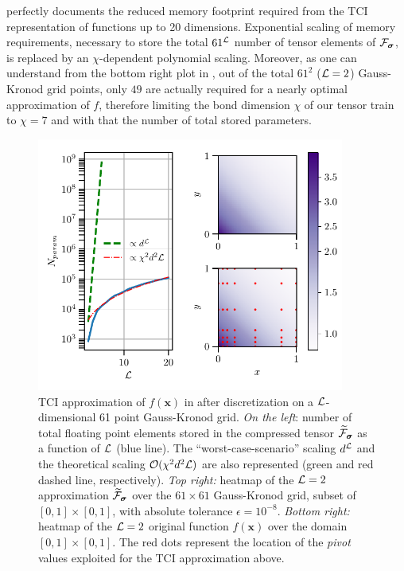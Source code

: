 \begin{example}
 perfectly documents the reduced memory footprint required from the TCI representation of functions up to 20 dimensions. Exponential scaling of memory requirements, necessary to store the total $61^{\mathcal{L}}$ number of tensor elements of $\mathcal{F}_{\boldsymbol{\sigma}}$, is replaced by an $\chi$-dependent polynomial scaling. Moreover, as one can understand from the bottom right plot in , out of the total $61^2$ ($\mathcal{L}=2$) Gauss-Kronod grid points, only $49$ are actually required for a nearly optimal approximation of $f$, therefore limiting the bond dimension $\chi$ of our tensor train to $\chi = 7$ and with that the number of total stored parameters. 
\begin{figure}[ht!]
		\centering
		\includegraphics[width=0.9\textwidth]{figures/TCI_memory_scaling+heatmap.pdf}
		\caption{TCI approximation of $f(\boldsymbol{x})$ in  after discretization on a $\mathcal{L}$-dimensional 61 point Gauss-Kronod grid. \textit{On the left}: number of total floating point elements stored in the compressed tensor $\widetilde{\mathcal{F}}_{\boldsymbol{\sigma}}$ as a function of $\mathcal{L}$ (blue line). The ``worst-case-scenario'' scaling $d^{\mathcal{L}}$ and the theoretical scaling $\mathcal{O} (\chi^2d^2\mathcal{L})$ are also represented (green and red dashed line, respectively). \textit{Top right:} heatmap of the $\mathcal{L} = 2$ approximation $\widetilde{\mathcal{F}}_{\boldsymbol{\sigma}}$ over the $61\times61$ Gauss-Kronod grid, subset of $[0,1]\times[0,1]$, with absolute tolerance $\epsilon = 10^{-8}$. \textit{Bottom right:} heatmap of the $\mathcal{L} = 2$ original function  $f(\boldsymbol{x})$ over the domain $[0,1]\times[0,1]$. The red dots represent the location of the \textit{pivot} values exploited for the TCI approximation above.
		}
		\label{fig:TCIscaling}
	\end{figure}
\label{ex:Ldimfunc}
\end{example}

